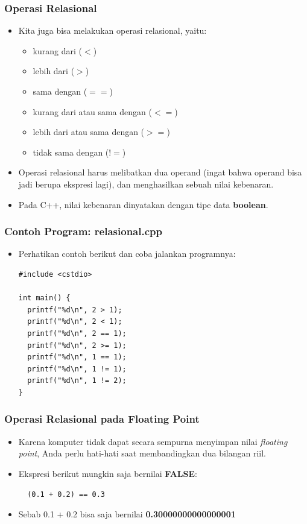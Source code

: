 \begin{frame}
\frametitle{Operasi Relasional}
\begin{itemize}
  \item Kita juga bisa melakukan operasi relasional, yaitu:
  \begin{itemize}
    \item kurang dari ($<$)
    \item lebih dari ($>$)
    \item sama dengan ($==$)
    \item kurang dari atau sama dengan ($<=$)
    \item lebih dari atau sama dengan ($>=$)
    \item tidak sama dengan ($!=$)
  \end{itemize}
  \item Operasi relasional harus melibatkan dua operand (ingat bahwa operand bisa jadi berupa ekspresi lagi), dan menghasilkan sebuah nilai kebenaran.
  \item Pada C++, nilai kebenaran dinyatakan dengan tipe data \alert{\textbf{boolean}}.
\end{itemize}
\end{frame}

\begin{frame}[fragile]
\frametitle{Contoh Program: relasional.cpp}
\begin{itemize}
  \item Perhatikan contoh berikut dan coba jalankan programnya:
\begin{lstlisting}
#include <cstdio>

int main() {
  printf("%d\n", 2 > 1);
  printf("%d\n", 2 < 1);
  printf("%d\n", 2 == 1);
  printf("%d\n", 2 >= 1);
  printf("%d\n", 1 == 1);
  printf("%d\n", 1 != 1);
  printf("%d\n", 1 != 2);
}
\end{lstlisting}
\end{itemize}
\end{frame}

\begin{frame}[fragile]
\frametitle{Operasi Relasional pada Floating Point}
\begin{itemize}
  \item Karena komputer tidak dapat secara sempurna menyimpan nilai \textit{floating point}, Anda perlu hati-hati saat membandingkan dua bilangan riil.
  \item Ekspresi berikut mungkin saja bernilai \textbf{FALSE}:
  \begin{lstlisting}
  (0.1 + 0.2) == 0.3
  \end{lstlisting}
  \item Sebab 0.1 + 0.2 bisa saja bernilai \textbf{0.30000000000000001}
\end{itemize}
\end{frame}

